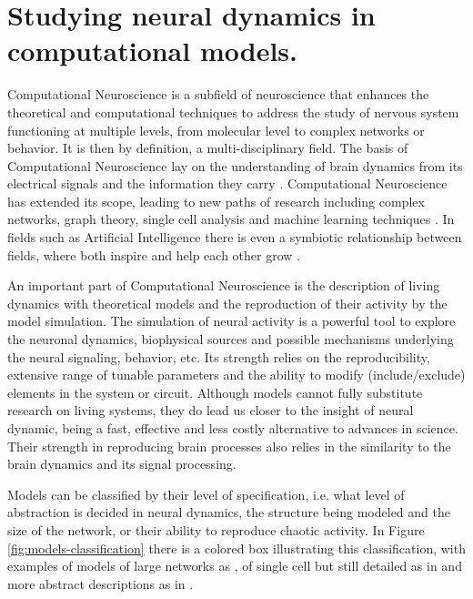 \section{Studying neural dynamics in computational models.}
Computational Neuroscience is a subfield of neuroscience that enhances the theoretical and computational techniques to address the study of nervous system functioning at multiple levels, from molecular level to complex networks or behavior. It is then by definition, a multi-disciplinary field. The basis of Computational Neuroscience lay on the understanding of brain dynamics from its electrical signals and the information they carry \parencite{schwiening_brief_2012,catterall_hodgkin-huxley_2012,dimitrov_information_2011,shannon_mathematical_1948}. Computational Neuroscience has extended its scope, leading to new paths of research including complex networks, graph theory, single cell analysis and machine learning techniques \parencite{cns2023}. In fields such as Artificial Intelligence there is even a symbiotic relationship between fields, where both inspire and help each other grow \parencite{amunts_human_2019,wozniak_deep_2020,goncalves_training_2020}.

An important part of Computational Neuroscience is the description of living dynamics with theoretical models and the reproduction of their activity by the model simulation. The simulation of neural activity is a powerful tool to explore the neuronal dynamics, biophysical sources and possible mechanisms underlying the neural signaling, behavior, etc. Its strength relies on the reproducibility, extensive range of tunable parameters and the ability to modify (include/exclude) elements in the system or circuit. Although models cannot fully substitute research on living systems, they do lead us closer to the insight of neural dynamic, being a fast, effective and less costly alternative to advances in science. Their strength in reproducing brain processes also relies in the similarity to the brain dynamics and its signal processing.

Models can be classified by their level of specification, i.e. what level of abstraction is decided in neural dynamics, the structure being modeled and the size of the network, or their ability to reproduce chaotic activity. In Figure \ref{fig:models-classification} there is a colored box illustrating this classification, with examples of models of large networks as \cite{potjans2014,bezaire2016}, of single cell but still detailed as in \cite{} and more abstract descriptions as in \cite{izhikevich_simple_2003}.


